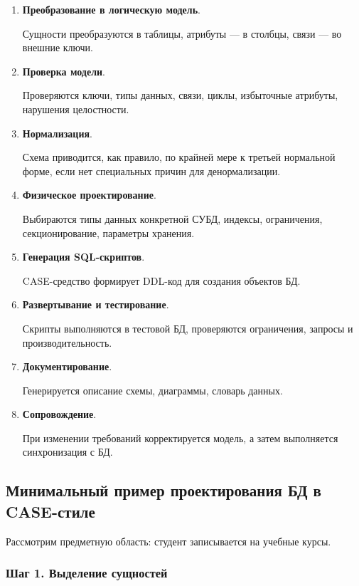 \documentclass[12pt,a4paper]{article}
\theoremstyle{remark}
\begin{document}
\begin{enumerate}
    \item \textbf{Преобразование в логическую модель}.

    Сущности преобразуются в таблицы, атрибуты --- в столбцы, связи --- во внешние ключи.

    \item \textbf{Проверка модели}.

    Проверяются ключи, типы данных, связи, циклы, избыточные атрибуты, нарушения целостности.

    \item \textbf{Нормализация}.

    Схема приводится, как правило, по крайней мере к третьей нормальной форме, если нет специальных причин для денормализации.

    \item \textbf{Физическое проектирование}.

    Выбираются типы данных конкретной СУБД, индексы, ограничения, секционирование, параметры хранения.

    \item \textbf{Генерация SQL-скриптов}.

    CASE-средство формирует DDL-код для создания объектов БД.

    \item \textbf{Развертывание и тестирование}.

    Скрипты выполняются в тестовой БД, проверяются ограничения, запросы и производительность.

    \item \textbf{Документирование}.

    Генерируется описание схемы, диаграммы, словарь данных.

    \item \textbf{Сопровождение}.

    При изменении требований корректируется модель, а затем выполняется синхронизация с БД.
\end{enumerate}

\subsection{Минимальный пример проектирования БД в CASE-стиле}

Рассмотрим предметную область: студент записывается на учебные курсы.

\subsubsection*{Шаг 1. Выделение сущностей}
\end{document}
